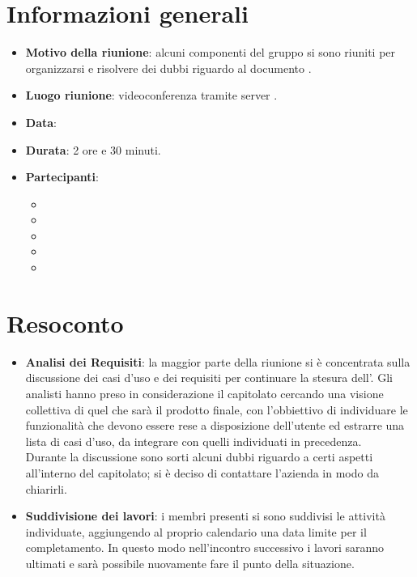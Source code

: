\section{Informazioni generali}
\begin{itemize}
\item \textbf{Motivo della riunione}: alcuni componenti del gruppo si sono riuniti per organizzarsi e risolvere dei dubbi riguardo al documento \AdR.
\item \textbf{Luogo riunione}: videoconferenza tramite server .
\item \textbf{Data}: \Data{}
\item \textbf{Durata}: 2 ore e 30 minuti.
\item \textbf{Partecipanti}:
	\begin{itemize}
	\item \BM{}
	\item \SG{}
	\item \SP{}
	\item \SH{}
	\item \PA{}
	\end{itemize}
\end{itemize}
\newpage
\section{Resoconto}
\begin{itemize}
\item \textbf{Analisi dei Requisiti}: la maggior parte della riunione si è concentrata sulla discussione dei casi d'uso e dei requisiti per continuare la stesura dell'\AdRv{}.
Gli analisti hanno preso in considerazione il capitolato cercando una visione collettiva di quel che sarà il prodotto finale, con l'obbiettivo di individuare le funzionalità che devono essere rese a disposizione dell'utente ed estrarre una lista di casi d'uso, da integrare con quelli individuati in precedenza. \\
Durante la discussione sono sorti alcuni dubbi riguardo a certi aspetti all’interno del capitolato; si è deciso di contattare l'azienda in modo da chiarirli. 

\item \textbf{Suddivisione dei lavori}: i membri presenti si sono suddivisi le attività individuate, aggiungendo al proprio calendario una data limite per il completamento. In questo modo nell'incontro successivo i lavori saranno ultimati e sarà possibile nuovamente fare il punto della situazione.

\end{itemize}

 